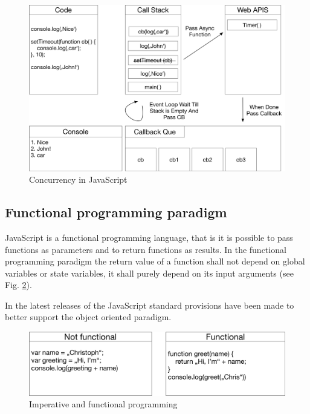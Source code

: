 \begin{figure}[H]
	\centering
	\includegraphics[width=1.0\linewidth]{bilder/grundlagen/Concurrency.png}
	\caption{Concurrency in JavaScript}
	\label{fig:CC}
\end{figure}

\subsection{Functional programming paradigm}

JavaScript is a functional programming language, that is it is possible to 
pass functions as parameters and to return
functions as results. In the functional programming paradigm the return value of a function shall not depend on global variables or state variables, it shall purely depend on its input arguments (see Fig. \ref{fig:FP})\cite{Steyer2014JavaScript}. 

In the latest releases of the JavaScript standard provisions have been made to better support the object
oriented paradigm.

\begin{figure}[H]
	\centering
	\includegraphics[scale=0.6]{bilder/grundlagen/fp.png}
	\caption{Imperative and functional programming}
	\label{fig:FP}
\end{figure}

